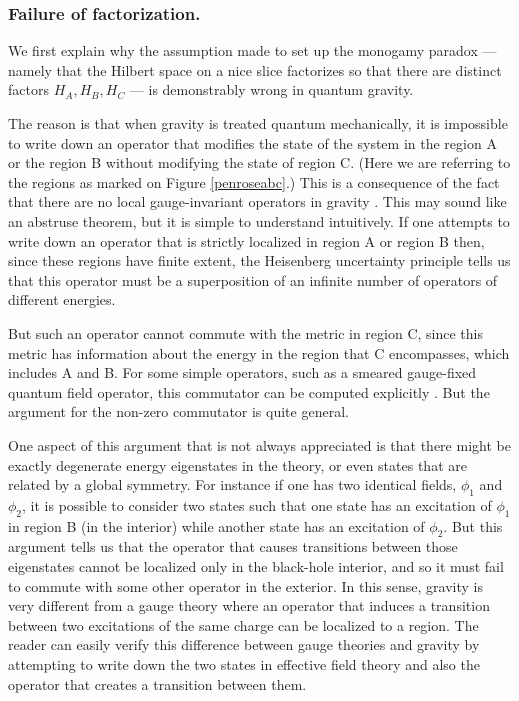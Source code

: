 \documentclass[12pt]{article}
\begin{document}
\subsubsection*{Failure of factorization.}
We first  explain why the assumption made to set up the monogamy paradox --- namely that the  Hilbert space on a nice slice factorizes so that there are distinct factors $H_{A}, H_{B}, H_{C}$ --- is demonstrably wrong in quantum gravity.

The reason is that when gravity is treated quantum mechanically, it is impossible to write down an operator that modifies the state of the system  in the region A or the region B without modifying the state of region C. (Here we are referring to the regions as marked on Figure \ref{penroseabc}.)   This is a consequence of the fact that there are no local gauge-invariant operators in gravity \cite{dewitt1960quantization, kuchar1991problem, Giddings:2005id}. This may sound like an abstruse theorem, but it is simple to understand intuitively.  If one attempts to write down an operator that is strictly localized in region A or region B  then, since these regions have finite extent, the Heisenberg uncertainty principle tells us that this operator must be a superposition of an infinite number of operators of different energies.

But such an operator cannot commute with the metric in region C, since this metric has information about the energy in the region that C encompasses, which includes A and B. For some simple operators, such as a smeared gauge-fixed quantum field operator, this commutator can be computed explicitly \cite{Donnelly:2018nbv}. But the argument for the non-zero commutator is quite general.

One aspect of this argument that is not always appreciated is that there might be exactly degenerate energy eigenstates in the theory, or even states that are related by a global symmetry. For instance if one has two identical fields, $\phi_1$ and $\phi_2$, it is possible to consider two states such that one state has an excitation of $\phi_1$ in region B (in the interior) while another state has an excitation of $\phi_2$.  But this argument tells us that the operator that causes transitions between those eigenstates cannot be localized only in the black-hole interior, and so it must fail to commute with some other operator in the exterior. In this sense, gravity is very different from a gauge theory where an operator that induces a transition between two excitations of the same charge can be localized to a region.  The reader can easily verify this difference between gauge theories and gravity by attempting to write down the two states in effective field theory and also the operator that creates a transition between them.
\end{document}
